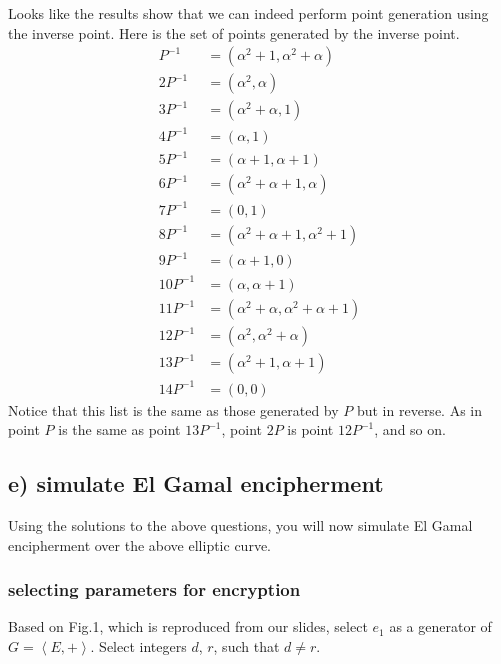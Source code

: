 \documentclass[a4paper,11pt]{exam}
\begin{document}
\noindent
Looks like the results show that we can indeed perform point generation using the inverse point. Here is the set of points generated by the inverse point. 
\begin{align*}
  P^{-1} &= (\alpha^2+1, \alpha^2+\alpha)\\
  2P^{-1} &= (\alpha^2, \alpha)\\
  3P^{-1} &= (\alpha^2+\alpha, 1)\\
  4P^{-1} &= (\alpha, 1)\\
  5P^{-1} &= (\alpha+1, \alpha+1)\\
  6P^{-1} &= (\alpha^2+\alpha+1, \alpha)\\
  7P^{-1} &= (0, 1)\\
  8P^{-1} &= (\alpha^2+\alpha+1, \alpha^2+1)\\
  9P^{-1} &= (\alpha+1, 0)\\
  10P^{-1} &= (\alpha, \alpha+1)\\
  11P^{-1} &= (\alpha^2+\alpha, \alpha^2+\alpha+1)\\
  12P^{-1} &= (\alpha^2, \alpha^2+\alpha)\\
  13P^{-1} &= (\alpha^2+1, \alpha+1)\\
  14P^{-1} &= (0, 0)
 \end{align*}
 \noindent
Notice that this list is the same as those generated by \(P\) but in reverse. As in point \(P\) is the same as point \(13P^{-1}\), point \(2P\) is point \(12P^{-1}\), and so on.

\subsection{e) simulate El Gamal encipherment}
\label{sec:org3c642a1}
Using the solutions to the above questions, you will now simulate El Gamal encipherment over the above elliptic curve.

\subsubsection{selecting parameters for encryption}
\label{sec:orgba17ca0}
Based on Fig.1, which is reproduced from our slides, select \(e_1\) as a generator of \(G = \left<E, +\right>\). Select integers \(d\), \(r\), such that \(d \ne r\).
\end{document}
